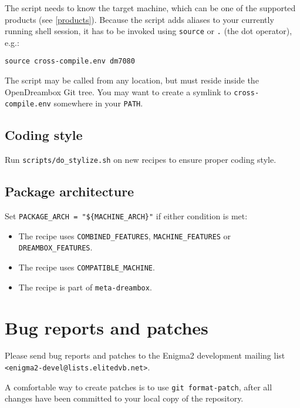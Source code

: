 \documentclass[a4paper]{article}
\newcommand{\shell}[1]{\texttt{\small #1}}
\begin{document}
    The script needs to know the target machine, which can be one of the supported products (see \ref{products}). Because the script
    adds aliases to your currently running shell session, it has to be invoked using \shell{source} or \shell{.} (the dot operator), e.g.:

    \shell{source cross-compile.env dm7080}

    The script may be called from any location, but must reside inside the OpenDreambox Git tree.
    You may want to create a symlink to \shell{cross-compile.env} somewhere in your \shell{PATH}.

  \subsection{Coding style}
    Run \shell{scripts/do\_stylize.sh} on new recipes to ensure proper coding style.

  \subsection {Package architecture}
    Set \shell{PACKAGE\_ARCH = "\$\{MACHINE\_ARCH\}"} if either condition is met:
    \begin{itemize}
      \item The recipe uses \shell{COMBINED\_FEATURES}, \shell{MACHINE\_FEATURES} or \shell{DREAMBOX\_FEATURES}.
      \item The recipe uses \shell{COMPATIBLE\_MACHINE}.
      \item The recipe is part of \shell{meta-dreambox}.
    \end{itemize}

\section{Bug reports and patches}

  Please send bug reports and patches to the Enigma2 development mailing list \shell{<enigma2-devel@lists.elitedvb.net>}.

  A comfortable way to create patches is to use \shell{git format-patch}, after all changes have been committed to your
  local copy of the repository.
\end{document}

